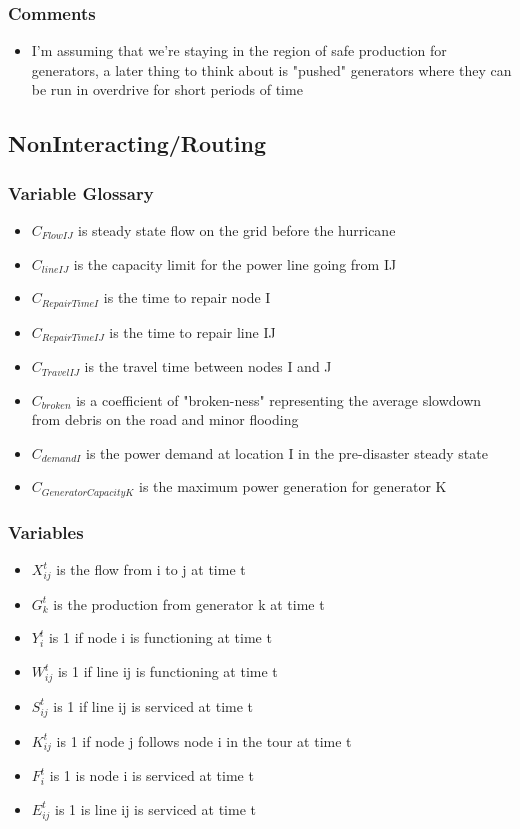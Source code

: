 \documentclass{article}
\begin{document}
	\subsubsection{Comments}
	\begin{itemize}
		\item I'm assuming that we're staying in the region of safe production for generators, a later thing to think about is "pushed" generators where they can be run in overdrive for short periods of time
	\end{itemize}
	
	\subsection{NonInteracting/Routing}
	\subsubsection{Variable Glossary}
	\begin{itemize}
		\item $C_{FlowIJ}$ is steady state flow on the grid before the hurricane
		\item $C_{lineIJ}$ is the capacity limit for the power line going from IJ
		\item $C_{RepairTimeI}$ is the time to repair node I
		\item $C_{RepairTimeIJ}$ is the time to repair line IJ
		\item $C_{TravelIJ}$ is the travel time between nodes I and J
		\item $C_{broken}$ is a coefficient of "broken-ness" representing the average slowdown from debris on the road and minor flooding
		\item $C_{demandI}$ is the power demand at location I in the pre-disaster steady state
		\item $C_{GeneratorCapacityK}$ is the maximum power generation for generator K
	\end{itemize}
	\subsubsection{Variables}
	\begin{itemize}
		
		\item $X_{ij}^{t}$ is the flow from i to j at time t
		\item $G_{k}^t$ is the production from generator k at time t
		\item $Y_i^t$ is 1 if node i is functioning at time t
		\item $W_{ij}^t$ is 1 if line ij is functioning at time t
		\item $S_{ij}^t$ is 1 if line ij is serviced at time t
		\item $K_{ij}^t$ is 1 if node j follows node i in the tour at time t 
		\item $F_i^t$ is 1 is node i is serviced at time t 
		\item $E_{ij}^t$ is 1 is line ij is serviced at time t	
\end{itemize}
\end{document}
